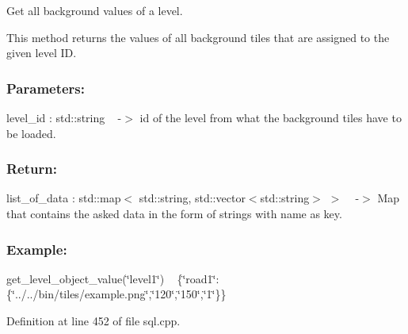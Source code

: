 Get all background values of a level. 

This method returns the values of all background tiles that are assigned to the given level ID.~\newline


\subsubsection*{Parameters\+: }

level\+\_\+id \+: std\+::string ~\newline
-\/$>$ id of the level from what the background tiles have to be loaded.

\subsubsection*{Return\+: }

list\+\_\+of\+\_\+data \+: std\+::map$<$ std\+::string, std\+::vector$<$std\+::string$>$ $>$ ~\newline
-\/$>$ Map that contains the asked data in the form of strings with name as key.~\newline


\subsubsection*{Example\+: }

get\+\_\+level\+\_\+object\+\_\+value(\char`\"{}level1\char`\"{}) ~\newline
\{\char`\"{}road1\char`\"{}\+:\{\char`\"{}../../bin/tiles/example.\+png\char`\"{},\char`\"{}120\char`\"{},\char`\"{}150\char`\"{},\char`\"{}1\char`\"{}\}\} 

Definition at line 452 of file sql.\+cpp.

